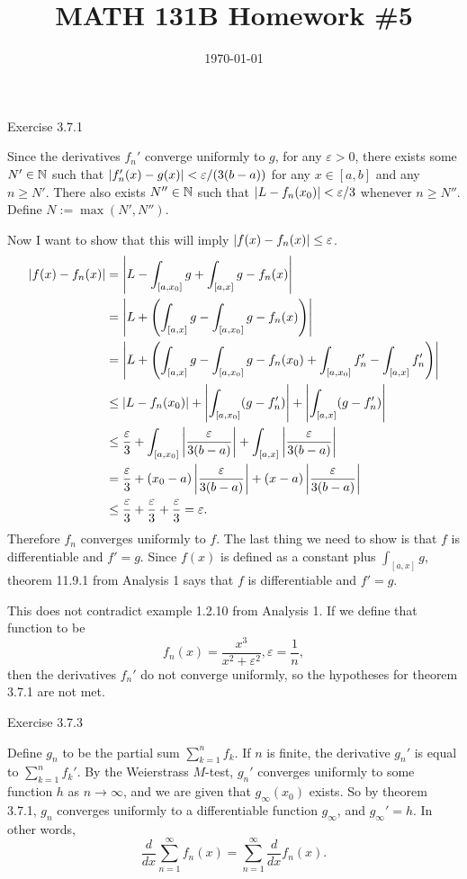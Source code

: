 \documentclass{article}
\date{\today}
\title{MATH 131B Homework \#5}
\begin{document}
\maketitle

\begin{prob}
    Exercise 3.7.1
\end{prob}
Since the derivatives $f_n'$ converge uniformly to $g$, for any $\varepsilon > 0$, there exists some $N' \in \mathbb{N}$ such that $\left\lvert f_n'(x) - g(x) \right\rvert < \varepsilon / (3(b-a))$ for any $x \in [a,b]$ and any $n \geq N'$. There also exists $N'' \in \mathbb{N}$ such that $\left\lvert L-f_n(x_0) \right\rvert < \varepsilon/3$ whenever $n \geq N''$. Define $N := \max(N', N'')$.
\par
Now I want to show that this will imply $\left\lvert f(x)-f_n(x) \right\rvert \leq \varepsilon$.
\begin{align*}
    \left\lvert f(x)-f_n(x) \right\rvert &= \left\lvert L - \int_{[a,x_0]} g + \int_{[a,x]} g - f_n(x) \right\rvert \\
                      &= \left\lvert L + \left(\int_{[a,x]} g - \int_{[a,x_0]} g - f_n(x)\right) \right\rvert \\
                      &= \left\lvert L + \left(\int_{[a,x]} g - \int_{[a,x_0]} g - f_n(x_0) + \int_{[a,x_0]} f_n' - \int_{[a,x]} f_n' \right) \right\rvert \\
                      &\leq \left\lvert L-f_n(x_0) \right\rvert + \left\lvert  \int_{[a,x_0]} (g-f_n') \right\rvert+ \left\lvert  \int_{[a,x]} (g-f_n') \right\rvert \\
                      &\leq \frac{\varepsilon}{3} + \int_{[a,x_0]} \left\lvert  \frac{\varepsilon}{3(b-a)} \right\rvert + \int_{[a,x]} \left\lvert  \frac{\varepsilon}{3(b-a)} \right\rvert \\
                      &= \frac{\varepsilon}{3} + (x_0-a) \left\lvert  \frac{\varepsilon}{3(b-a)} \right\rvert + (x-a) \left\lvert  \frac{\varepsilon}{3(b-a)} \right\rvert \\
                      &\leq \frac{\varepsilon}{3} + \frac{\varepsilon}{3} + \frac{\varepsilon}{3} = \varepsilon.
\end{align*}
Therefore $f_n$ converges uniformly to $f$. The last thing we need to show is that $f$ is differentiable and $f'=g$. Since $f(x)$ is defined as a constant plus $\int_{[a,x]} g$, theorem 11.9.1 from Analysis 1 says that $f$ is differentiable and $f'=g$.
\par
This does not contradict example 1.2.10 from Analysis 1. If we define that function to be
\[ f_n(x) = \frac{x^3}{x^2+\varepsilon^2}, \varepsilon = \frac{1}{n}, \]
then the derivatives $f_n'$ do not converge uniformly, so the hypotheses for theorem 3.7.1 are not met.

\bigskip
\begin{prob}
    Exercise 3.7.3
\end{prob}
Define $g_n$ to be the partial sum $\sum_{k=1}^n f_k$. If $n$ is finite, the derivative $g_n'$ is equal to $\sum_{k=1}^n f_k'$. By the Weierstrass $M$-test, $g_n'$ converges uniformly to some function $h$ as $n \rightarrow \infty$, and we are given that $g_\infty(x_0)$ exists. So by theorem 3.7.1, $g_n$ converges uniformly to a differentiable function $g_\infty$, and $g_\infty' = h$. In other words,
\[ \frac{d}{dx} \sum_{n=1}^\infty f_n(x) = \sum_{n=1}^\infty \frac{d}{dx} f_n(x). \]
\end{document}
